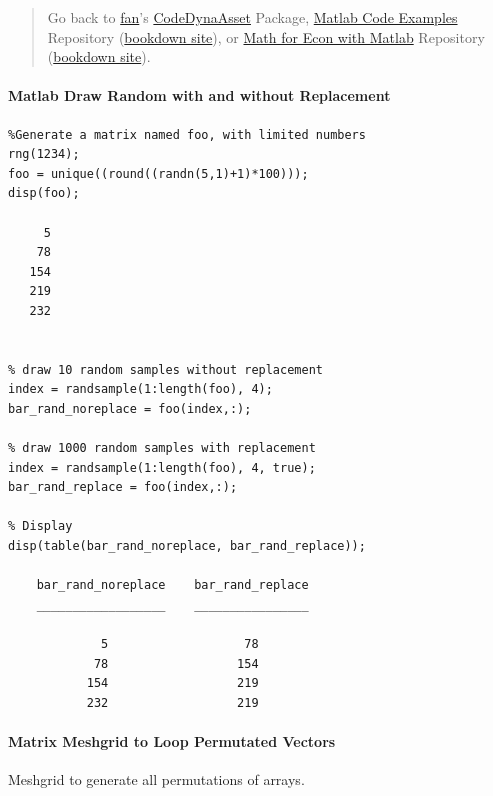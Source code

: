 \documentclass[
]{book}
\begin{document}
\begin{quote}
Go back to \href{http://fanwangecon.github.io/}{fan}'s \href{https://fanwangecon.github.io/CodeDynaAsset/}{CodeDynaAsset} Package, \href{https://fanwangecon.github.io/M4Econ/}{Matlab Code Examples} Repository (\href{https://fanwangecon.github.io/M4Econ/bookdown}{bookdown site}), or \href{https://fanwangecon.github.io/Math4Econ/}{Math for Econ with Matlab} Repository (\href{https://fanwangecon.github.io/Math4Econ/bookdown}{bookdown site}).
\end{quote}

\hypertarget{matlab-draw-random-with-and-without-replacement}{%
\paragraph{\texorpdfstring{\textbf{Matlab Draw Random with and without Replacement}}{Matlab Draw Random with and without Replacement}}\label{matlab-draw-random-with-and-without-replacement}}

\begin{verbatim}
%Generate a matrix named foo, with limited numbers
rng(1234);
foo = unique((round((randn(5,1)+1)*100)));
disp(foo);

     5
    78
   154
   219
   232


% draw 10 random samples without replacement
index = randsample(1:length(foo), 4);
bar_rand_noreplace = foo(index,:);

% draw 1000 random samples with replacement
index = randsample(1:length(foo), 4, true);
bar_rand_replace = foo(index,:);

% Display
disp(table(bar_rand_noreplace, bar_rand_replace));

    bar_rand_noreplace    bar_rand_replace
    __________________    ________________

             5                   78       
            78                  154       
           154                  219       
           232                  219       
\end{verbatim}

\hypertarget{matrix-meshgrid-to-loop-permutated-vectors}{%
\paragraph{Matrix Meshgrid to Loop Permutated Vectors}\label{matrix-meshgrid-to-loop-permutated-vectors}}

Meshgrid to generate all permutations of arrays.
\end{document}
